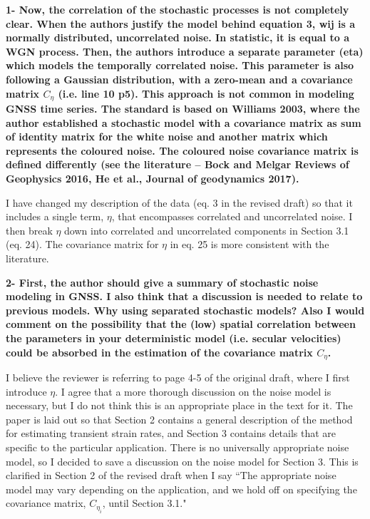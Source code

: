 \documentclass[10pt,a4paper]{letter}
\begin{document}
\begin{letter}{}
\textbf{1- Now, the correlation of the stochastic processes is not completely
clear. When the authors justify the model behind equation 3, wij is a
normally distributed, uncorrelated noise. In statistic, it is equal to
a WGN process. Then, the authors introduce a separate parameter (eta)
which models the temporally correlated noise. This parameter is also
following a Gaussian distribution, with a zero-mean and a covariance
matrix $C_{\eta}$ (i.e. line 10 p5). This approach is not common in
modeling GNSS time series. The standard is based on Williams 2003,
where the author established a stochastic model with a covariance
matrix as sum of identity matrix for the white noise and another
matrix which represents the coloured noise. The coloured noise
covariance matrix is defined differently (see the literature – Bock and
Melgar Reviews of Geophysics 2016, He et al., Journal of geodynamics
2017).}

I have changed my description of the data (eq. 3 in the revised draft)
so that it includes a single term, $\eta$, that encompasses correlated
and uncorrelated noise. I then break $\eta$ down into correlated and
uncorrelated components in Section 3.1 (eq. 24). The covariance matrix
for $\eta$ in eq. 25 is more consistent with the literature.

\textbf{2- First, the author should give a summary of stochastic noise
modeling in GNSS. I also think that a discussion is needed to relate
to previous models. Why using separated stochastic models? Also I
would comment on the possibility that the (low) spatial correlation
between the parameters in your deterministic model (i.e. secular
velocities) could be absorbed in the estimation of the covariance
matrix $C_{\eta}$.}

I believe the reviewer is referring to page 4-5 of the original draft,
where I first introduce $\eta$. I agree that a more thorough
discussion on the noise model is necessary, but I do not think this is
an appropriate place in the text for it. The paper is laid out so that
Section 2 contains a general description of the method for estimating
transient strain rates, and Section 3 contains details that are
specific to the particular application. There is no universally
appropriate noise model, so I decided to save a discussion on the
noise model for Section 3. This is clarified in Section 2 of the
revised draft when I say ``The appropriate noise model may vary
depending on the application, and we hold off on specifying the
covariance matrix, $C_{\eta_i}$, until Section 3.1."


\end{letter}
\end{document}

